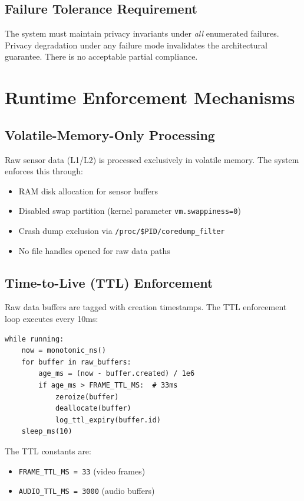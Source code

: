 \documentclass[conference]{IEEEtran}
\begin{document}
\subsection{Failure Tolerance Requirement}
The system must maintain privacy invariants under \textit{all} enumerated failures. Privacy degradation under any failure mode invalidates the architectural guarantee. There is no acceptable partial compliance.

\section{Runtime Enforcement Mechanisms}

\subsection{Volatile-Memory-Only Processing}
Raw sensor data (L1/L2) is processed exclusively in volatile memory. The system enforces this through:
\begin{itemize}
    \item RAM disk allocation for sensor buffers
    \item Disabled swap partition (kernel parameter \texttt{vm.swappiness=0})
    \item Crash dump exclusion via \texttt{/proc/\$PID/coredump\_filter}
    \item No file handles opened for raw data paths
\end{itemize}

\subsection{Time-to-Live (TTL) Enforcement}
Raw data buffers are tagged with creation timestamps. The TTL enforcement loop executes every 10ms:

\begin{lstlisting}[caption={TTL Enforcement Loop}]
while running:
    now = monotonic_ns()
    for buffer in raw_buffers:
        age_ms = (now - buffer.created) / 1e6
        if age_ms > FRAME_TTL_MS:  # 33ms
            zeroize(buffer)
            deallocate(buffer)
            log_ttl_expiry(buffer.id)
    sleep_ms(10)
\end{lstlisting}

The TTL constants are:
\begin{itemize}
    \item \texttt{FRAME\_TTL\_MS = 33} (video frames)
    \item \texttt{AUDIO\_TTL\_MS = 3000} (audio buffers)
\end{itemize}
\end{document}
